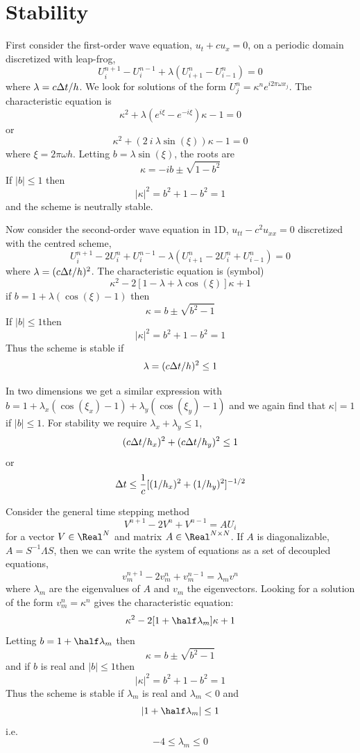 \documentclass[10pt]{article}
\begin{document}
\section{Stability}

First consider the first-order wave equation, $u_t + c u_x =0$, on a periodic
domain discretized with leap-frog,
\[
    U_i^{n+1} - U_i^{n-1} + \lambda( U_{i+1}^n - U_{i-1}^n )=0
\]
where $\lambda=c {\Delta t}/h$.
We look for solutions of the form $U_j^n = \kappa^n e^{i 2\pi\omega x_j}$. The characteristic equation is
\[
   \kappa^2 +\lambda( e^{i\xi} -e^{-i\xi} )\kappa -1 =0
\]
 or
\[
  \kappa^2 +  (2~i~\lambda\sin(\xi))\kappa -1 =0
\]
where $\xi=2\pi\omega h$. Letting $b=\lambda\sin(\xi)$, the roots are
\[
   \kappa = -ib \pm \sqrt{ 1-b^2 }
\]
If $|b|\le 1$ then
\[
  |\kappa|^2 = b^2 + 1-b^2 =1 
\]
and the scheme is neutrally stable.

Now consider the second-order wave equation in 1D, $u_{tt} - c^2 u_{xx}=0$ discretized
with the centred scheme,
\[
    U_i^{n+1} -2U_i^n + U_i^{n-1} - \lambda( U_{i+1}^n -2U_i^n + U_{i-1}^n )=0
\]
where $\lambda=(c{\Delta t}/h)^2$.
The characteristic equation is (symbol)
\[
   \kappa^2 - 2[ 1-\lambda +\lambda\cos(\xi)]\kappa +1
\]
if $b=1+\lambda(\cos(\xi)-1)$ then
\[
   \kappa = b \pm \sqrt{b^2-1}
\]
If $|b|\le 1 $then
\[
  |\kappa|^2 = b^2 + 1-b^2 =1 
\]
Thus the scheme is stable if
\[
    \lambda = (c{\Delta t}/h)^2 \le 1
\]

In two dimensions we get a similar expression with $b=1 +\lambda_x(\cos(\xi_x)-1)+\lambda_y(\cos(\xi_y)-1)$
and we again find that $\kappa|=1$ if $|b|\le1$. 
For stability we require $\lambda_x+\lambda_y \le 1$, 
\[
     (c{\Delta t}/h_x)^2 + (c{\Delta t}/h_y)^2 \le 1
\]
or
\begin{equation}
    {\Delta t} \le {1\over c} [ (1/h_x)^2 + (1/h_y)^2]^{-1/2} \label{eq:timeStepRestriction}
\end{equation}


Consider the general time stepping method
\[
    V^{n+1} -2 V^n + V^{n-1} = A U_i 
\]
for a vector $V\in \Real^N$ and matrix $A\in \Real^{N\times N}$. 
If $A$ is diagonalizable, $A=S^{-1} \Lambda S$, then we can write the system of equations as a 
set of decoupled equations,
\[
    v_m^{n+1} -2v_m^n + v_m^{n-1} = \lambda_m v^n
\]
where $\lambda_m$ are the eigenvalues of $A$ and $v_m$ the eigenvectors.
Looking for a solution of the form $v_m^n=\kappa^n$ gives the
characteristic equation:
\[
    \kappa^2 - 2[ 1 +\half \lambda_m]\kappa +1
\]
Letting $b=1 +\half \lambda_m$ then
\[
  \kappa = b \pm \sqrt{b^2-1}
\]
and if $b$ is real and $|b|\le 1 $then
\[
  |\kappa|^2 = b^2 + 1-b^2 =1 
\]
Thus the scheme is stable if $\lambda_m$ is real and $\lambda_m<0$ and 
\[
    |1 +\half \lambda_m|  \le 1
\]
i.e.
\begin{equation}
     -4 \le \lambda_m \le 0    \label{generalStability}
\end{equation}
\end{document}
